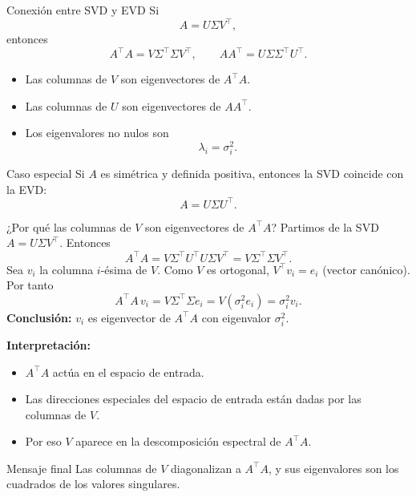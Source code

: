 \begin{frame}{Conexión entre SVD y EVD}
Si
\[
  A=U\Sigma V^\top,
\]
entonces
\[
  A^\top A = V\Sigma^\top\Sigma V^\top,
  \qquad
  AA^\top = U\Sigma\Sigma^\top U^\top.
\]
\begin{itemize}\small
  \item Las columnas de $V$ son eigenvectores de $A^\top A$.
  \item Las columnas de $U$ son eigenvectores de $AA^\top$.
  \item Los eigenvalores no nulos son
  \[
    \lambda_i = \sigma_i^2.
  \]
\end{itemize}
\begin{block}{Caso especial}
Si $A$ es simétrica y definida positiva, entonces la SVD coincide con la EVD:
\[
  A = U\Sigma U^\top.
\]
\end{block}
\end{frame}

\begin{frame}{¿Por qué las columnas de $V$ son eigenvectores de $A^\top A$?}
\scriptsize
\setlength{\abovedisplayskip}{2pt}
\setlength{\belowdisplayskip}{2pt}
\setlength{\abovedisplayshortskip}{1pt}
\setlength{\belowdisplayshortskip}{1pt}
\setlength{\itemsep}{0.1em}
Partimos de la SVD $A = U \Sigma V^\top$. Entonces
\[
  A^\top A
  = V \Sigma^\top U^\top U \Sigma V^\top
  = V \Sigma^\top \Sigma V^\top.
\]
Sea $v_i$ la columna $i$-ésima de $V$. Como $V$ es ortogonal, $V^\top v_i = e_i$ (vector canónico). Por tanto
\[
  A^\top A\, v_i
  = V \Sigma^\top \Sigma e_i
  = V(\sigma_i^2 e_i)
  = \sigma_i^2 v_i.
\]
\textbf{Conclusión:} $v_i$ es eigenvector de $A^\top A$ con eigenvalor $\sigma_i^2$.

\textbf{Interpretación:}
\begin{itemize}
  \item $A^\top A$ actúa en el espacio de entrada.
  \item Las direcciones especiales del espacio de entrada están dadas por las columnas de $V$.
  \item Por eso $V$ aparece en la descomposición espectral de $A^\top A$.
\end{itemize}
\vspace{-0.2em}
\begin{block}{Mensaje final}
\centering
Las columnas de $V$ diagonalizan a $A^\top A$, y sus eigenvalores son los cuadrados de los valores singulares.
\end{block}
\end{frame}

